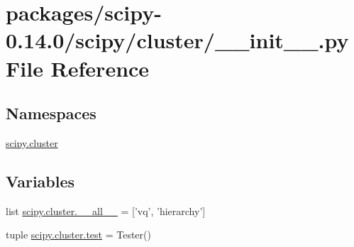 \hypertarget{packages_2scipy-0_814_80_2scipy_2cluster_2____init_____8py}{}\section{packages/scipy-\/0.14.0/scipy/cluster/\+\_\+\+\_\+init\+\_\+\+\_\+.py File Reference}
\label{packages_2scipy-0_814_80_2scipy_2cluster_2____init_____8py}
\subsection*{Namespaces}
\begin{DoxyCompactItemize}
\item 
 \hyperlink{namespacescipy_1_1cluster}{scipy.\+cluster}
\end{DoxyCompactItemize}
\subsection*{Variables}
\begin{DoxyCompactItemize}
\item 
list \hyperlink{namespacescipy_1_1cluster_a7dfac980b82e8960ad76243be426fa34}{scipy.\+cluster.\+\_\+\+\_\+all\+\_\+\+\_\+} = \mbox{[}'vq', 'hierarchy'\mbox{]}
\item 
tuple \hyperlink{namespacescipy_1_1cluster_acac402aafa03aff490caf26fab80aab4}{scipy.\+cluster.\+test} = Tester()
\end{DoxyCompactItemize}
